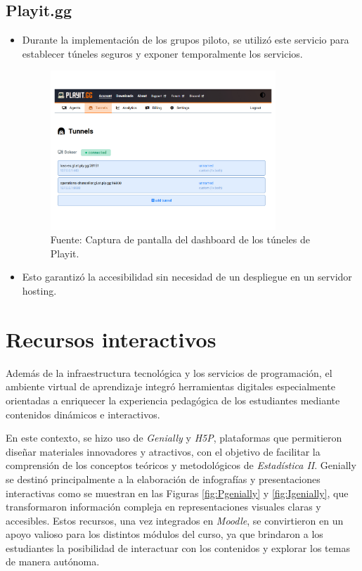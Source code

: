 \documentclass[letter,oneside,12pt,spanish]{report}
\begin{document}
\subsection{Playit.gg}
\begin{itemize}
    \item Durante la implementación de los grupos piloto, se utilizó este servicio para establecer túneles seguros y exponer temporalmente los servicios.
    
	\begin{figure}[ht]
		\centering
		\includegraphics[width=0.8\textwidth]{Figs/dashboard playit.gg.pdf}
		\label{fig:Playit}
		\\Fuente: Captura de pantalla del dashboard de los túneles de Playit.
\end{figure}
	
	\item Esto garantizó la accesibilidad sin necesidad de un despliegue en un servidor hosting.
\end{itemize}

\section{Recursos interactivos}

Además de la infraestructura tecnológica y los servicios de programación, el ambiente virtual de aprendizaje integró herramientas digitales especialmente orientadas a enriquecer la experiencia pedagógica de los estudiantes mediante contenidos dinámicos e interactivos.

En este contexto, se hizo uso de \textit{Genially} y \textit{H5P}, plataformas que permitieron diseñar materiales innovadores y atractivos, con el objetivo de facilitar la comprensión de los conceptos teóricos y metodológicos de \textit{Estadística II}. Genially se destinó principalmente a la elaboración de infografías y presentaciones interactivas como se muestran en las Figuras \ref{fig:Pgenially} y \ref{fig:Igenially}, que transformaron información compleja en representaciones visuales claras y accesibles. Estos recursos, una vez integrados en \textit{Moodle}, se convirtieron en un apoyo valioso para los distintos módulos del curso, ya que brindaron a los estudiantes la posibilidad de interactuar con los contenidos y explorar los temas de manera autónoma.
\end{document}
